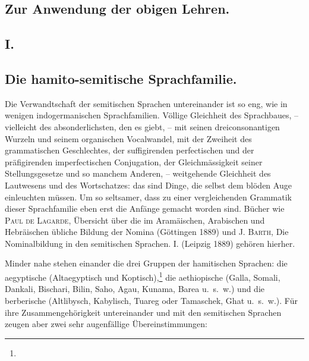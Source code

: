 \subsection*{Zur Anwendung der obigen Lehren.}
\subsection*{I.}\label{III.I.I.4.I}
\subsection*{Die hamito-semitische Sprachfamilie.}
Die Verwandtschaft der semitischen Sprachen untereinander ist so eng, wie in wenigen indogermanischen Sprachfamilien. Völlige Gleichheit des Sprachbaues, – vielleicht des absonderlichsten, den es giebt, – mit seinen dreiconsonantigen Wurzeln und seinem organischen Vocalwandel, mit der Zweiheit des grammatischen Geschlechtes, der suffigirenden perfectischen und der präfigirenden imperfectischen Conjugation, der Gleichmässigkeit seiner Stellungsgesetze und so manchem Anderen, – weitgehende Gleichheit des Lautwesens und des Wortschatzes: das sind Dinge, die selbst dem blöden Auge einleuchten müssen. Um so seltsamer, dass zu einer vergleichenden Grammatik dieser Sprachfamilie eben erst die Anfänge gemacht worden sind. Bücher wie \textsc{Paul de Lagarde}, Übersicht über die im Aramäischen, Arabischen und Hebräischen übliche Bildung der Nomina (Göttingen 1889) und \textsc{J. Barth}, Die Nominalbildung in den semitischen Sprachen. I. (Leipzig 1889) gehören hierher.

\label{fp.171}

\largerpage[2]Minder nahe stehen einander die drei Gruppen der hamitischen Sprachen: die aegyptische (Altaegyptisch und Koptisch),\footnote{ } die aethiopische (Galla, Somali, Dankali, Bischari, Bilin, Saho, Agau, Kunama, Barea u.~s.~w.) und die berberische (Altlibysch, Kabylisch, Tuareg oder Tamaschek, Ghat u.~s.~w.). Für ihre Zusammengehörigkeit untereinander und mit den semitischen Sprachen zeugen aber zwei sehr augenfällige Übereinstimmungen:

